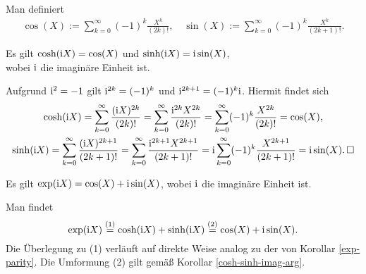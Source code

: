 \newpage
\begin{Definition} Man definiert
\begin{gather*}
\cos(X) := \sum_{k=0}^\infty (-1)^k\frac{X^k}{(2k)!},\quad
\sin(X) := \sum_{k=0}^\infty (-1)^k\frac{X^k}{(2k+1)!}.
\end{gather*}
\end{Definition}

\begin{Korollar}\label{cosh-sinh-imag-arg}
Es gilt $\cosh(\mathrm i X) = \cos(X)$ und $\sinh(\mathrm i X) = \mathrm i\sin(X)$,\\
wobei $\mathrm i$ die imaginäre Einheit ist.
\end{Korollar}
\begin{Beweis}
Aufgrund $\mathrm i^2=-1$ gilt $\mathrm i^{2k} = (-1)^k$ und $\mathrm i^{2k+1} = (-1)^k\mathrm i$.
Hiermit findet sich
\begin{gather*}
\cosh(\mathrm i X) = \sum_{k=0}^\infty\frac{(\mathrm i X)^{2k}}{(2k)!}
= \sum_{k=0}^\infty\frac{\mathrm i^{2k} X^{2k}}{(2k)!}
= \sum_{k=0}^\infty (-1)^k\frac{X^{2k}}{(2k)!} = \cos(X),\\
\sinh(\mathrm i X) = \sum_{k=0}^\infty\frac{(\mathrm i X)^{2k+1}}{(2k+1)!}
= \sum_{k=0}^\infty\frac{\mathrm i^{2k+1} X^{2k+1}}{(2k+1)!}
= \mathrm i\sum_{k=0}^\infty (-1)^k\frac{X^{2k+1}}{(2k+1)!}
= \mathrm i\sin(X).\,\square
\end{gather*}
\end{Beweis}

\begin{Korollar}\newlinefirst
Es gilt $\exp(\mathrm i X) = \cos(X)+\mathrm i\sin(X)$, wobei $\mathrm i$ die
imaginäre Einheit ist.
\end{Korollar}
\begin{Beweis}
Man findet
\[\exp(\mathrm i X) \stackrel{\text{(1)}}= \cosh(\mathrm i X) + \sinh(\mathrm i X)
\stackrel{\text{(2)}}= \cos(X)+\mathrm i\sin(X).\]
Die Überlegung zu (1) verläuft auf direkte Weise analog zu der von
Korollar \ref{exp-parity}. Die Umformung (2) gilt gemäß Korollar
\ref{cosh-sinh-imag-arg}.\,\qedsymbol
\end{Beweis}
